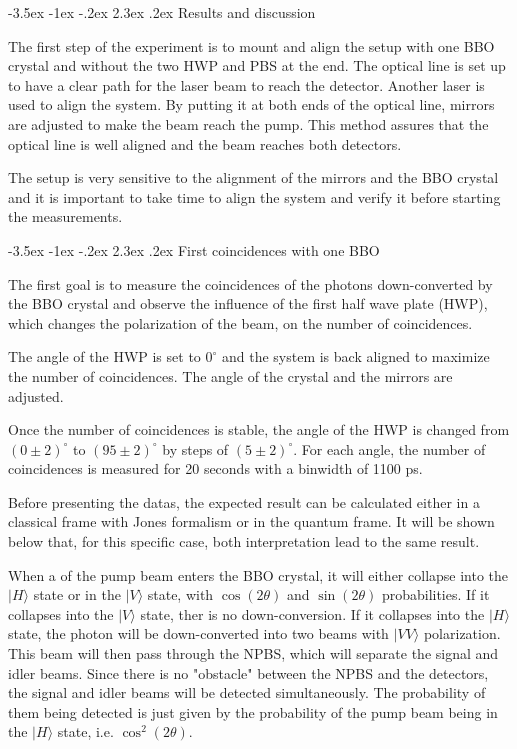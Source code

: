 \documentclass[a4paper, 12pt,oneside]{article}
\makeatletter
\renewcommand{\section}{\@startsection {section}{1}{\z@}%
             {-3.5ex \@plus -1ex \@minus -.2ex}%
             {2.3ex \@plus.2ex}%
             {\normalfont\normalsize\bfseries}}
\renewcommand{\subsection}{\@startsection {subsection}{1}{\z@}%
             {-3.5ex \@plus -1ex \@minus -.2ex}%
             {2.3ex \@plus.2ex}%
             {\normalfont\normalsize\bfseries}}
\makeatother
\begin{document}
\section{Results and discussion}

The first step of the experiment is to mount and align the setup with one BBO crystal and without the two HWP and PBS at the end. The optical line is set up to have a clear path for the laser beam to reach the detector. Another laser is used to align the system. By putting it at both ends of the optical line, mirrors are adjusted to make the beam reach the pump. This method assures that the optical line is well aligned and the beam reaches both detectors.

The setup is very sensitive to the alignment of the mirrors and the BBO crystal and it is important to take time to align the system and verify it before starting the measurements.

\subsection{First coincidences with one BBO}

The first goal is to measure the coincidences of the photons down-converted by the BBO crystal and observe the influence of the first half wave plate (HWP), which changes the polarization of the beam, on the number of coincidences. 

The angle of the HWP is set to $0^{\circ}$ and the system is back aligned to maximize the number of coincidences. The angle of the crystal and the mirrors are adjusted.

Once the number of coincidences is stable, the angle of the HWP is changed from $(0\pm2)^{\circ}$ to $(95\pm2)^{\circ}$ by steps of $(5\pm2)^{\circ}$. For each angle, the number of coincidences is measured for 20 seconds with a binwidth of 1100 ps.

Before presenting the datas, the expected result can be calculated either in a classical frame with Jones formalism or in the quantum frame.  It will be shown below that, for this specific case, both interpretation lead to the same result. 

When a of the pump beam enters the BBO crystal, it will either collapse into the $|H\rangle$ state or in the $|V\rangle$ state, with $\cos(2\theta)$ and $\sin(2\theta)$ probabilities. If it collapses into the $|V\rangle$ state, ther is no down-conversion. If it collapses into the $|H\rangle$ state, the photon will be down-converted into two beams with $|VV\rangle$ polarization. This beam will then pass through the NPBS, which will separate the signal and idler beams. Since there is no "obstacle" between the NPBS and the detectors, the signal and idler beams will be detected simultaneously. The probability of them being detected is just given by the probability of the pump beam being in the $|H\rangle$ state, i.e. $\cos^2(2\theta)$.
\end{document}
